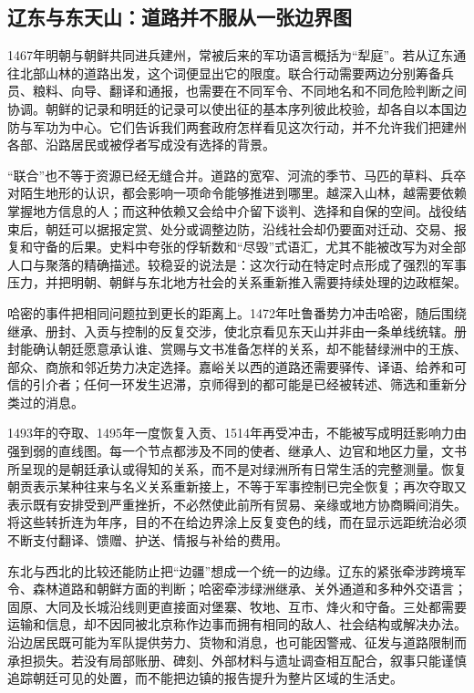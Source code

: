 \subsection{辽东与东天山：道路并不服从一张边界图}

1467年明朝与朝鲜共同进兵建州，常被后来的军功语言概括为“犁庭”。若从辽东通往北部山林的道路出发，这个词便显出它的限度。联合行动需要两边分别筹备兵员、粮料、向导、翻译和通报，也需要在不同军令、不同地名和不同危险判断之间协调。朝鲜的记录和明廷的记录可以使出征的基本序列彼此校验，却各自以本国边防与军功为中心。它们告诉我们两套政府怎样看见这次行动，并不允许我们把建州各部、沿路居民或被俘者写成没有选择的背景。

“联合”也不等于资源已经无缝合并。道路的宽窄、河流的季节、马匹的草料、兵卒对陌生地形的认识，都会影响一项命令能够推进到哪里。越深入山林，越需要依赖掌握地方信息的人；而这种依赖又会给中介留下谈判、选择和自保的空间。战役结束后，朝廷可以据报定赏、处分或调整边防，沿线社会却仍要面对迁动、交易、报复和守备的后果。史料中夸张的俘斩数和“尽毁”式语汇，尤其不能被改写为对全部人口与聚落的精确描述。较稳妥的说法是：这次行动在特定时点形成了强烈的军事压力，并把明朝、朝鲜与东北地方社会的关系重新推入需要持续处理的边政框架。

哈密的事件把相同问题拉到更长的距离上。1472年吐鲁番势力冲击哈密，随后围绕继承、册封、入贡与控制的反复交涉，使北京看见东天山并非由一条单线统辖。册封能确认朝廷愿意承认谁、赏赐与文书准备怎样的关系，却不能替绿洲中的王族、部众、商旅和邻近势力决定选择。嘉峪关以西的道路还需要驿传、译语、给养和可信的引介者；任何一环发生迟滞，京师得到的都可能是已经被转述、筛选和重新分类过的消息。

1493年的夺取、1495年一度恢复入贡、1514年再受冲击，不能被写成明廷影响力由强到弱的直线图。每一个节点都涉及不同的使者、继承人、边官和地区力量，文书所呈现的是朝廷承认或得知的关系，而不是对绿洲所有日常生活的完整测量。恢复朝贡表示某种往来与名义关系重新接上，不等于军事控制已完全恢复；再次夺取又表示既有安排受到严重挫折，不必然使此前所有贸易、亲缘或地方协商瞬间消失。将这些转折连为年序，目的不在给边界涂上反复变色的线，而在显示远距统治必须不断支付翻译、馈赠、护送、情报与补给的费用。

东北与西北的比较还能防止把“边疆”想成一个统一的边缘。辽东的紧张牵涉跨境军令、森林道路和朝鲜方面的判断；哈密牵涉绿洲继承、关外通道和多种外交语言；固原、大同及长城沿线则更直接面对堡寨、牧地、互市、烽火和守备。三处都需要运输和信息，却不因同被北京称作边事而拥有相同的敌人、社会结构或解决办法。沿边居民既可能为军队提供劳力、货物和消息，也可能因警戒、征发与道路限制而承担损失。若没有局部账册、碑刻、外部材料与遗址调查相互配合，叙事只能谨慎追踪朝廷可见的处置，而不能把边镇的报告提升为整片区域的生活史。

